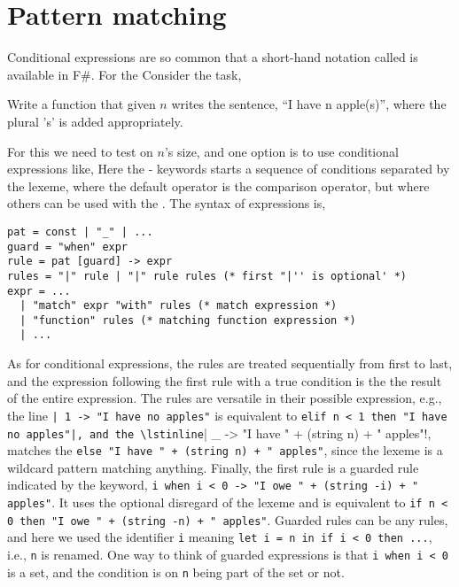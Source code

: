 \section{Pattern matching}
Conditional expressions are so common that a short-hand notation called  is available in F\#. For the 
Consider the task,
\begin{problem}
  Write a function that given $n$ writes the sentence, ``I have n apple(s)'', where the plural 's' is added appropriately.
\end{problem}
For this we need to test on $n$'s size, and one option is to use conditional expressions like,
%
%
Here the - keywords starts a sequence of conditions separated by the \lexeme{|} lexeme, where the default operator is the \lexeme{=} comparison operator, but where others can be used with the . The syntax of  expressions is,
\begin{lstlisting}[language=ebnf]
pat = const | "_" | ...
guard = "when" expr
rule = pat [guard] -> expr
rules = "|" rule | "|" rule rules (* first "|'' is optional' *)
expr = ... 
  | "match" expr "with" rules (* match expression *)
  | "function" rules (* matching function expression *)
  | ...
\end{lstlisting}
As for conditional expressions, the rules are treated sequentially from first to last, and the expression following the first rule with a true condition is the the result of the entire expression. The rules are versatile in their possible expression, e.g., the line \lstinline!| 1 -> "I have no apples"! is equivalent to \lstinline!elif n < 1 then "I have no apples"|, and the \lstinline!| \_ -> "I have " + (string n) + " apples"!, matches the \lstinline!else "I have " + (string n) + " apples"!, since the \lexeme{_} lexeme is a wildcard pattern matching anything. Finally, the first rule is a guarded rule indicated by the  keyword, \lstinline!i when i < 0 -> "I owe " + (string -i) + " apples"!. It uses the optional disregard of the \lexeme{|} lexeme and is equivalent to \lstinline!if n < 0 then "I owe " + (string -n) + " apples"!. Guarded rules can be any rules, and here we used the identifier \lstinline!i! meaning \lstinline!let i = n in if i < 0 then ...!, i.e., \lstinline!n! is renamed. One way to think of guarded expressions is that \lstinline!i when i < 0! is a set, and the condition is on \lstinline!n! being part of the set or not. 

